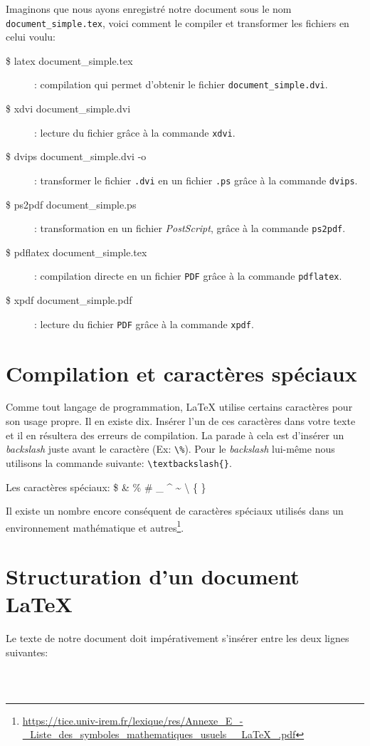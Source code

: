 Imaginons que nous ayons enregistré notre document sous le nom \texttt{document\_simple.tex}, voici comment le compiler et transformer les fichiers en celui voulu:
\begin{description}
	\item[\$ latex document\_simple.tex]: compilation qui permet d'obtenir le fichier \verb|document_simple.dvi|.
	\item[\$ xdvi document\_simple.dvi]: lecture du fichier grâce à la commande \verb|xdvi|.
	\item[\$ dvips document\_simple.dvi -o]: transformer le fichier \texttt{.dvi} en un fichier \texttt{.ps} grâce à la commande \verb|dvips|.
	\item[\$ ps2pdf document\_simple.ps]: transformation en un fichier \textit{PostScript}, grâce à la commande \verb|ps2pdf|.
	\item[\$ pdflatex document\_simple.tex]: compilation directe en un fichier \texttt{PDF} grâce à la commande \verb|pdflatex|.
	\item[\$ xpdf document\_simple.pdf]: lecture du fichier \texttt{PDF} grâce à la commande \verb|xpdf|.
\end{description}
\medskip

\section{Compilation et caractères spéciaux}
Comme tout langage de programmation, \LaTeX{} utilise certains caractères pour son usage propre. Il en existe dix. Insérer l'un de ces caractères dans votre texte et il en résultera des erreurs de compilation. La parade à cela est d'insérer un \textit{backslash} juste avant le caractère (Ex: \verb|\%|). Pour le \textit{backslash} lui-même nous utilisons la commande suivante: \verb|\textbackslash{}|.
\medskip

Les caractères spéciaux: \$ \& \% \# \_ \^{} \~{} \textbackslash{} \{ \}
\medskip

Il existe un nombre encore conséquent de caractères spéciaux utilisés dans un environnement mathématique et autres\footnote{\url{https://tice.univ-irem.fr/lexique/res/Annexe_E_-_Liste_des_symboles_mathematiques_usuels__LaTeX_.pdf}}.
\medskip

\section{Structuration d'un document \LaTeX}
Le texte de notre document doit impérativement s'insérer entre les deux lignes suivantes:
\begin{verbatim}
    
    
\end{verbatim}
\medskip

